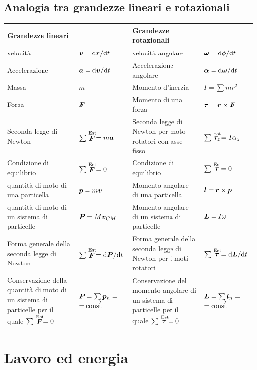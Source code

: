 \section{Analogia tra grandezze lineari e \mbox{rotazionali}}
\begin{small}
\begin{tabular}{p{4.0cm}p{2.45cm}p{4.0cm}p{2.38cm}}
\hline
Grandezze lineari &&Grandezze rotazionali&\\
\hline
velocità&$\boldsymbol{v}=\mathrm{d} \boldsymbol{r}/\mathrm{d} t$ & velocità angolare&$\boldsymbol{\omega}=\mathrm{d} \phi/\mathrm{d} t$\\
Accelerazione&$\boldsymbol{a}=\mathrm{d} \boldsymbol{v}/\mathrm{d} t$&Accelerazione
angolare&$\boldsymbol{\alpha}=\mathrm{d} \boldsymbol{\omega}/\mathrm{d} t$\\
Massa&$m$&Momento d'inerzia&$I=\sum mr^2$\\
Forza&$\boldsymbol{F}$&Momento di una forza&$\boldsymbol{\tau}=\boldsymbol{r}\times \boldsymbol{F}$\\
Seconda legge di Newton&$\sum \stackrel{\text{Est}}{\boldsymbol{F}}=m\boldsymbol{a}$& Seconda legge di Newton per moto rotatori con asse
fisso&$\sum\stackrel{\text{Est}}{\boldsymbol{\tau}_z}=I\alpha_z$\\
Condizione di equilibrio&$\sum\stackrel{\text{Est}}{\boldsymbol{F}}=0$&Condizione di equilibrio&$\sum\stackrel{\text{Est}}{\boldsymbol{\tau}}=0$\\
quantità di moto di una particella&$\boldsymbol{p}=m\boldsymbol{v}$&Momento
angolare di una particella&$\boldsymbol{l}=\boldsymbol{r}\times \boldsymbol{p}$\\
quantità di moto di un sistema di particelle&$\boldsymbol{P}=M\boldsymbol{v}_{CM}$&Momento angolare di un sistema di particelle&$\boldsymbol{L}=I\omega$\\
Forma generale della seconda legge di
Newton&$\sum\stackrel{\text{Est}}{\boldsymbol{F}}=\mathrm{d} \boldsymbol{P}/\mathrm{d} t$&Forma
generale della seconda legge di Newton per i moti
rotatori&$\sum\stackrel{\text{Est}}{\boldsymbol{\tau}}=\mathrm{d} \boldsymbol{L}/\mathrm{d} t$\\
Conservazione della quantità di moto di un sistema di particelle
per il quale $\sum\stackrel{\text{Est}}{\boldsymbol{F}}=0$&$\boldsymbol{P}=\sum
\boldsymbol{p}_n=$ \mbox{$=\overrightarrow{\text{const}}$}&Conservazione del momento angolare di un sistema di particelle per il quale $\sum\stackrel{\text{Est}}{\boldsymbol{\tau}}=0$&$\boldsymbol{L}=\sum \boldsymbol{l}_n=$ \mbox{$=\overrightarrow{\text{const}}$}\\
\hline
\end{tabular}
\end{small}

\chapter{Lavoro ed energia}

